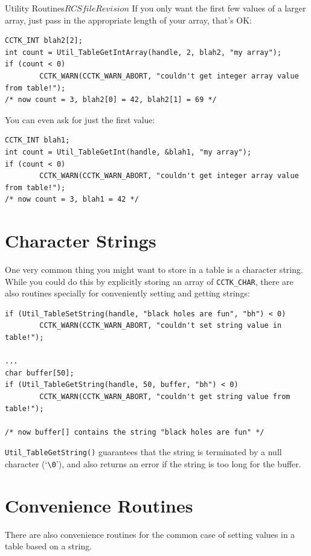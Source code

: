\begin{cactuspart}{Utility Routines}{$RCSfile$}{$Revision$}
If you only want the first few values of a larger array, just pass
in the appropriate length of your array,
that's OK:
\begin{verbatim}
CCTK_INT blah2[2];
int count = Util_TableGetIntArray(handle, 2, blah2, "my array");
if (count < 0)
        CCTK_WARN(CCTK_WARN_ABORT, "couldn't get integer array value from table!");
/* now count = 3, blah2[0] = 42, blah2[1] = 69 */
\end{verbatim}
You can even ask for just the first value:
\begin{verbatim}
CCTK_INT blah1;
int count = Util_TableGetInt(handle, &blah1, "my array");
if (count < 0)
        CCTK_WARN(CCTK_WARN_ABORT, "couldn't get integer array value from table!");
/* now count = 3, blah1 = 42 */
\end{verbatim}


\section{Character Strings}

One very common thing you might want to store in a table is a
character string.  While you could do this by explicitly storing
an array of \verb|CCTK_CHAR|, there are also routines
specially for conveniently setting and getting strings:
\begin{verbatim}
if (Util_TableSetString(handle, "black holes are fun", "bh") < 0)
        CCTK_WARN(CCTK_WARN_ABORT, "couldn't set string value in table!");

...
char buffer[50];
if (Util_TableGetString(handle, 50, buffer, "bh") < 0)
        CCTK_WARN(CCTK_WARN_ABORT, "couldn't get string value from table!");

/* now buffer[] contains the string "black holes are fun" */
\end{verbatim}

\verb|Util_TableGetString()| guarantees that the string is
terminated by a null character (`\verb|\0|'), and also returns an
error if the string is too long for the buffer.


\section{Convenience Routines}

There are also convenience routines for the common case of setting
values in a table based on a string.


\end{cactuspart}
